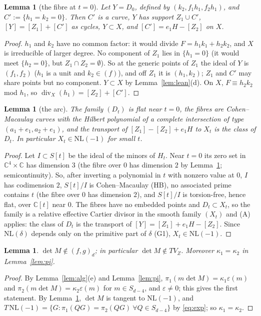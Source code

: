 \documentclass[11pt]{article}
\numberwithin{equation}{section}
\newtheorem{lemma}[theorem]{Lemma}
\theoremstyle{remark}
\newcommand{\CC}{\mathbb{C}}
\newcommand{\NL}{\mathrm{NL}}
\newcommand{\VZ}{V_Z}
\begin{document}
\begin{lemma}[the fibre at $t=0$]\label{lem:Y}
Let $Y=D_0$, defined by $(k_2,f_1h_1,f_2h_1)$, and $C':=\{h_1=k_2=0\}$. Then $C'$ is a curve, $Y$ has support
$Z_1\cup C'$, $[Y]=[Z_1]+[C']$ as cycles, $Y\subset X$, and $[C']=e_1H-[Z_2]$ on $X$.
\end{lemma}
\begin{proof}
$h_1$ and $k_2$ have no common factor: it would divide $F=h_1k_1+h_2k_2$, and $X$ is irreducible of larger
degree. No component of $Z_1$ lies in $\{h_1=0\}$ (it would meet $\{h_2=0\}$, but $Z_1\cap Z_2=\emptyset$). So at
the generic points of $Z_1$ the ideal of $Y$ is $(f_1,f_2)$ ($h_1$ is a unit and $k_2\in(f)$), and off $Z_1$ it
is $(h_1,k_2)$; $Z_1$ and $C'$ may share points but no component. $Y\subset X$ by Lemma~\ref{lem:lean}(d). On
$X$, $F\equiv h_2k_2$ mod $h_1$, so $\operatorname{div}_X(h_1)=[Z_2]+[C']$.
\end{proof}

\begin{lemma}[the arc]\label{lem:arc}
The family $(D_t)$ is flat near $t=0$, the fibres are Cohen--Macaulay curves with the Hilbert polynomial of a
complete intersection of type $(a_1+e_1,a_2+e_1)$, and the transport of $[Z_1]-[Z_2]+e_1H$ to $X_t$ is the class
of $D_t$. In particular $X_t\in\NL(-1)$ for small $t$.
\end{lemma}
\begin{proof}
Let $I\subset S[t]$ be the ideal of the minors of $H_t$. Near $t=0$ its zero set in $\CC^4\times\CC$ has
dimension $3$ (the fibre over $0$ has dimension $2$ by Lemma~\ref{lem:Y}; semicontinuity). So, after inverting a
polynomial in $t$ with nonzero value at $0$, $I$ has codimension $2$, $S[t]/I$ is Cohen--Macaulay (HB), no
associated prime contains $t$ (the fibre over $0$ has dimension $2$), and $S[t]/I$ is torsion-free, hence flat,
over $\CC[t]$ near $0$. The fibres have no embedded points and $D_t\subset X_t$, so the family is a relative effective
Cartier divisor in the smooth family $(X_t)$ and (A) applies: the class of $D_t$ is the transport of
$[Y]=[Z_1]+e_1H-[Z_2]$. Since $\NL(\delta)$ depends only on the primitive part of $\delta$ (G1), $X_t\in\NL(-1)$.
\end{proof}

\begin{lemma}\label{lem:detM}
$\det M\notin(f,g)_d$; in particular $\det M\notin T\VZ$. Moreover $\kappa_1=\kappa_2$ in Lemma~\ref{lem:pi}.
\end{lemma}
\begin{proof}
By Lemma~\ref{lem:alg}(e) and Lemma~\ref{lem:pi}, $\pi_1(m\det M)=\kappa_1\varepsilon(m)$ and
$\pi_2(m\det M)=\kappa_2\varepsilon(m)$ for $m\in S_{d-4}$, and $\varepsilon\ne0$; this gives the first statement.
By Lemma~\ref{lem:arc}, $\det M$ is tangent to $\NL(-1)$, and
$T\,\NL(-1)=\{G:\pi_1(QG)=\pi_2(QG)\ \forall Q\in S_{d-4}\}$ by \eqref{eq:exp}; so $\kappa_1=\kappa_2$.
\end{proof}
\end{document}
